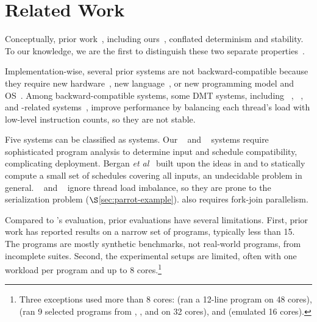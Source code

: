 \vspace{-.02in}
\section{Related Work} \label{sec:parrot-related}
\vspace{-.02in}

  Conceptually, prior
work~\cite{dthreads:sosp11, cui:tern:osdi10, peregrine:sosp11,
  determinator:osdi10}, including ours~\cite{cui:tern:osdi10,
  peregrine:sosp11}, conflated determinism and stability.  To our
knowledge, we are the first to distinguish these two separate
properties~\cite{smt:cacm,smt:hotpar13}.

Implementation-wise, several prior systems are not backward-compatible
because they require new hardware~\cite{dmp:asplos09}, new
language~\cite{dpj:oopsla09}, or new programming model and
OS~\cite{determinator:osdi10}.  Among backward-compatible systems, some
DMT systems, including \kendo~\cite{kendo:asplos09},
\coredet~\cite{coredet:asplos10}, and \coredet-related
systems~\cite{dos:osdi10, ddos:asplos13}, improve performance by balancing
each thread's load with low-level instruction counts, so they are not
stable.

Five systems can be classified as \smt systems.  Our
\tern~\cite{cui:tern:osdi10} and \peregrine~\cite{peregrine:sosp11} systems
require sophisticated program analysis to determine input and schedule
compatibility, complicating deployment. Bergan {\it et
  al}~\cite{bergan:oopsla13} built upon the ideas in \tern and \peregrine
to statically compute a small set of schedules covering all inputs, an
undecidable problem in general.  \grace~\cite{grace:oopsla09} and \dthreads~\cite{dthreads:sosp11} ignore thread load
imbalance, so they are prone to the serialization problem
($\S$\ref{sec:parrot-example}). \grace also requires
fork-join parallelism.

Compared to \parrot's evaluation, prior evaluations have several limitations.
First, prior work has reported results on a narrow set of programs,
typically less than 15.  The programs are mostly synthetic benchmarks, not
real-world programs, from incomplete suites.  Second, the experimental
setups are limited, often with one workload per program and up to 8
cores.\footnote{Three exceptions used more than 8 cores:
  \cite{kendo:wodet11} (ran a 12-line program on 48 cores),
  \cite{aviram:thesis} (ran 9 selected programs from \parsec, \splashx, and
  \npb on 32 cores), and \cite{dmp:asplos09} (emulated 16 cores).}


